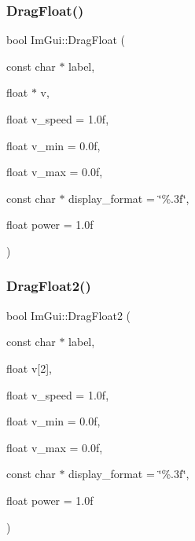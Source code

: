 \hypertarget{namespace_im_gui_ac62335909eaaa63a1ead0226e836baeb}{}\label{namespace_im_gui_ac62335909eaaa63a1ead0226e836baeb} 
\subsubsection{\texorpdfstring{Drag\+Float()}{DragFloat()}}
{\footnotesize\ttfamily bool Im\+Gui\+::\+Drag\+Float (\begin{DoxyParamCaption}\item[{const char $\ast$}]{label,  }\item[{float $\ast$}]{v,  }\item[{float}]{v\+\_\+speed = {\ttfamily 1.0f},  }\item[{float}]{v\+\_\+min = {\ttfamily 0.0f},  }\item[{float}]{v\+\_\+max = {\ttfamily 0.0f},  }\item[{const char $\ast$}]{display\+\_\+format = {\ttfamily \char`\"{}\%.3f\char`\"{}},  }\item[{float}]{power = {\ttfamily 1.0f} }\end{DoxyParamCaption})}

\hypertarget{namespace_im_gui_a2852e4c3b872ed5a5d28047f0290f29c}{}\label{namespace_im_gui_a2852e4c3b872ed5a5d28047f0290f29c} 
\subsubsection{\texorpdfstring{Drag\+Float2()}{DragFloat2()}}
{\footnotesize\ttfamily bool Im\+Gui\+::\+Drag\+Float2 (\begin{DoxyParamCaption}\item[{const char $\ast$}]{label,  }\item[{float}]{v\mbox{[}2\mbox{]},  }\item[{float}]{v\+\_\+speed = {\ttfamily 1.0f},  }\item[{float}]{v\+\_\+min = {\ttfamily 0.0f},  }\item[{float}]{v\+\_\+max = {\ttfamily 0.0f},  }\item[{const char $\ast$}]{display\+\_\+format = {\ttfamily \char`\"{}\%.3f\char`\"{}},  }\item[{float}]{power = {\ttfamily 1.0f} }\end{DoxyParamCaption})}

